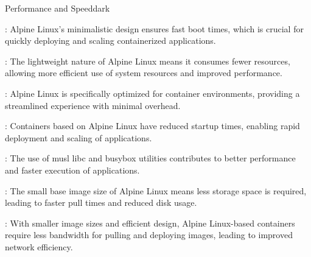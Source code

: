 \label{Performance and Speed}
\begin{baseBoxThree}{Performance and Speed}{dark}
    \begin{posnexItemize}
        \item[\sA] : Alpine Linux's minimalistic design ensures fast boot times, which is crucial for quickly deploying and scaling containerized applications.
        \item[\sA] : The lightweight nature of Alpine Linux means it consumes fewer resources, allowing more efficient use of system resources and improved performance.
        \item[\sA] : Alpine Linux is specifically optimized for container environments, providing a streamlined experience with minimal overhead.
        \item[\sA] : Containers based on Alpine Linux have reduced startup times, enabling rapid deployment and scaling of applications.
        \item[\sA] : The use of musl libc and busybox utilities contributes to better performance and faster execution of applications.
        \item[\sA] : The small base image size of Alpine Linux means less storage space is required, leading to faster pull times and reduced disk usage.
        \item[\sA] : With smaller image sizes and efficient design, Alpine Linux-based containers require less bandwidth for pulling and deploying images, leading to improved network efficiency.
    \end{posnexItemize}
\end{baseBoxThree}

